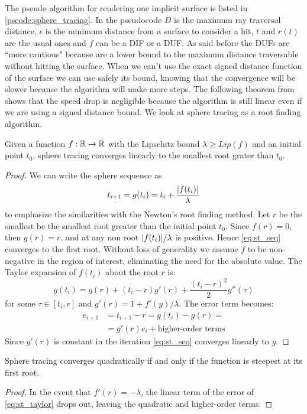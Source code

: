 \noindent
The pseudo algorithm for rendering one implicit surface is listed in \autoref{pscode:sphere_tracing}.
In the pseudocode $D$ is the maximum ray traversal distance, $\epsilon$ is the minimum distance from a surface to consider a hit, $t$ and $r(t)$ are the usual ones and $f$ can be a DIF or a DUF.
As said before the DUFs are ``more cautious" because are a lower bound to the maximum distance traversable without hitting the surface.
When we can't use the exact signed distance function of the surface we can use safely its bound, knowing that the convergence will be slower because the algorithm will make more steps.
The following theorem from \cite{hart1996} shows that the speed drop is negligible because the algorithm is still linear even if we are using a signed distance bound.
We look at sphere tracing as a root finding algorithm.
\begin{theorem}
Given a function $f: \mathbb{R} \to \mathbb{R}$ with the Lipschitz bound $\lambda \geq Lip(f)$ and an initial point $t_0$, sphere tracing converges linearly to the smallest root grater than $t_0$.
\end{theorem}
\begin{proof}
  We can write the sphere sequence as
  \begin{equation}\label{eq:st_seq}
  t_{i+1} = g(t_i) = t_i + \dfrac{\lvert f(t_i) \lvert}{\lambda}
  \end{equation}
  to emphasize the similarities with the Newton's root finding method.
  Let $r$ be the smallest be the smallest root greater than the initial point $t_0$.
  Since $f(r) = 0$, then $g(r) = r$, and at any non root $\lvert f(t_i) \lvert/\lambda$ is positive.
  Hence \autoref{eq:st_seq} converges to the first root.
  Without loss of generality we assume $f$ to be non-negative in the region of interest, eliminating the need for the absolute value.
  The Taylor expansion of $f(t_i)$ about the root $r$ is:
  \begin{equation}\label{eq:st_taylor}
    g(t_i) = g(r) + (t_i - r) g'(r) + \dfrac{(t_i - r)^2}{2} g''(\tau)
  \end{equation}
  for some $\tau \in [t_i, r]$ and $g'(r) = 1 + f'(y)/\lambda$.
  The error term becomes:
  \begin{align*}
    e_{i+1} &= t_{i+1} - r = g(t_i) - g(r) =\\
            &= g'(r)e_i + \text{higher-order terms}
  \end{align*}
  Since $g'(r)$ is constant in the iteration \autoref{eq:st_seq} converges linearly to $y$.
\end{proof}
\begin{corollary}
  Sphere tracing converges quadratically if and only if the function is steepest at its first root.
\end{corollary}
\begin{proof}
  In the event that $f'(r) = - \lambda$, the linear term of the error of \autoref{eq:st_taylor} drops out, leaving the quadratic and higher-order terms.
\end{proof}

